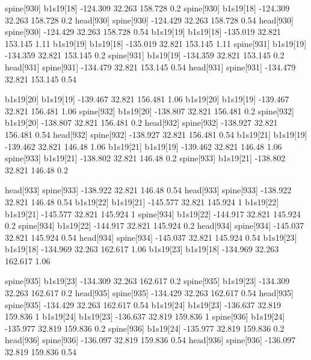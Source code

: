 spine[930]    b1s19[18]    -124.309    32.263    158.728    0.2
spine[930]    b1s19[18]    -124.309    32.263    158.728    0.2
head[930]    spine[930]    -124.429    32.263    158.728    0.54
head[930]    spine[930]    -124.429    32.263    158.728    0.54
b1s19[19]    b1s19[18]    -135.019    32.821    153.145    1.11
b1s19[19]    b1s19[18]    -135.019    32.821    153.145    1.11
spine[931]    b1s19[19]    -134.359    32.821    153.145    0.2
spine[931]    b1s19[19]    -134.359    32.821    153.145    0.2
head[931]    spine[931]    -134.479    32.821    153.145    0.54
head[931]    spine[931]    -134.479    32.821    153.145    0.54


b1s19[20]    b1s19[19]    -139.467    32.821    156.481    1.06
b1s19[20]    b1s19[19]    -139.467    32.821    156.481    1.06
spine[932]    b1s19[20]    -138.807    32.821    156.481    0.2
spine[932]    b1s19[20]    -138.807    32.821    156.481    0.2
head[932]    spine[932]    -138.927    32.821    156.481    0.54
head[932]    spine[932]    -138.927    32.821    156.481    0.54
b1s19[21]    b1s19[19]    -139.462    32.821    146.48    1.06
b1s19[21]    b1s19[19]    -139.462    32.821    146.48    1.06
spine[933]    b1s19[21]    -138.802    32.821    146.48    0.2
spine[933]    b1s19[21]    -138.802    32.821    146.48    0.2


head[933]    spine[933]    -138.922    32.821    146.48    0.54
head[933]    spine[933]    -138.922    32.821    146.48    0.54
b1s19[22]    b1s19[21]    -145.577    32.821    145.924    1
b1s19[22]    b1s19[21]    -145.577    32.821    145.924    1
spine[934]    b1s19[22]    -144.917    32.821    145.924    0.2
spine[934]    b1s19[22]    -144.917    32.821    145.924    0.2
head[934]    spine[934]    -145.037    32.821    145.924    0.54
head[934]    spine[934]    -145.037    32.821    145.924    0.54
b1s19[23]    b1s19[18]    -134.969    32.263    162.617    1.06
b1s19[23]    b1s19[18]    -134.969    32.263    162.617    1.06


spine[935]    b1s19[23]    -134.309    32.263    162.617    0.2
spine[935]    b1s19[23]    -134.309    32.263    162.617    0.2
head[935]    spine[935]    -134.429    32.263    162.617    0.54
head[935]    spine[935]    -134.429    32.263    162.617    0.54
b1s19[24]    b1s19[23]    -136.637    32.819    159.836    1
b1s19[24]    b1s19[23]    -136.637    32.819    159.836    1
spine[936]    b1s19[24]    -135.977    32.819    159.836    0.2
spine[936]    b1s19[24]    -135.977    32.819    159.836    0.2
head[936]    spine[936]    -136.097    32.819    159.836    0.54
head[936]    spine[936]    -136.097    32.819    159.836    0.54


